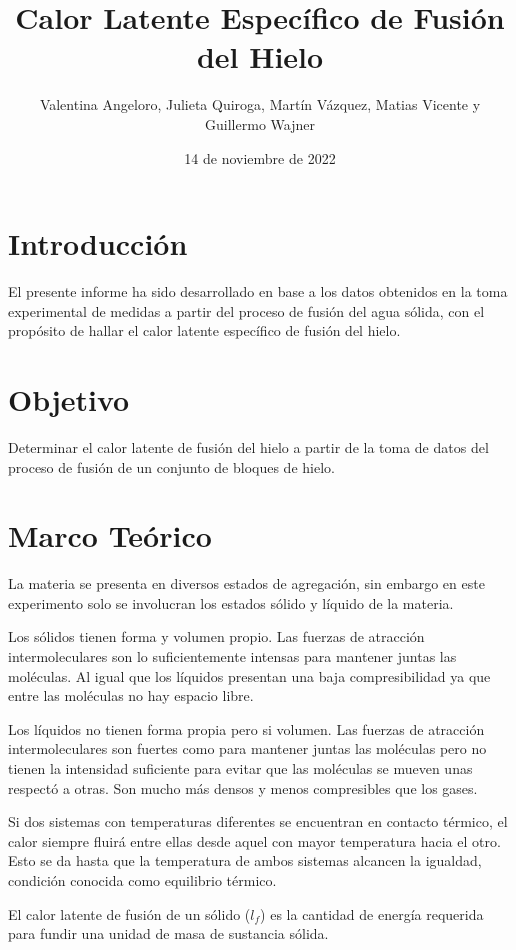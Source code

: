 \documentclass{article}
\title{Calor Latente Específico de Fusión del Hielo}
\author{Valentina Angeloro, Julieta Quiroga, Martín Vázquez, Matias Vicente y Guillermo Wajner}
\date{14 de noviembre de 2022}
\begin{document}
\maketitle

\section{Introducción}

El presente informe ha sido desarrollado en base a los datos obtenidos en la toma experimental de medidas a partir del proceso de fusión del agua sólida, con el propósito de hallar el calor latente específico de fusión del hielo.  

\section{Objetivo}

Determinar el calor latente de fusión del hielo a partir de la toma de datos del proceso de fusión de un conjunto de bloques de hielo.

\section{Marco Teórico}

La materia se presenta en diversos estados de agregación, sin embargo en este experimento solo se involucran los estados sólido y líquido de la materia. 

Los sólidos tienen forma y volumen propio. Las fuerzas de atracción intermoleculares son lo suficientemente intensas para mantener juntas las moléculas. Al igual que los líquidos presentan una baja compresibilidad ya que entre las moléculas no hay espacio libre.

Los líquidos no tienen forma propia pero si volumen. Las fuerzas de atracción intermoleculares son fuertes como para mantener juntas las moléculas pero no tienen la intensidad suficiente para evitar que las moléculas se mueven unas respectó a otras. Son mucho más densos y menos compresibles que los gases.

Si dos sistemas con temperaturas diferentes se encuentran en contacto térmico, el calor siempre fluirá entre ellas desde aquel con mayor temperatura hacia el otro. Esto se da hasta que la temperatura de ambos sistemas alcancen la igualdad, condición conocida como equilibrio térmico.

El calor latente de fusión de un sólido ($l_f$) es la cantidad de energía requerida para fundir una unidad de masa de sustancia sólida.
\end{document}
